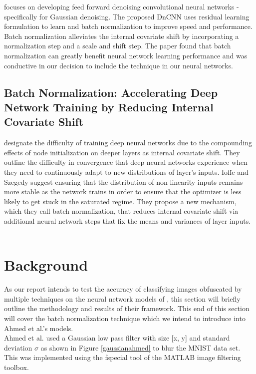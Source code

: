 \documentclass[12pt, titlepage]{article}
\begin{document}
\cite{zhang2017beyond} focuses on developing feed forward denoising convolutional neural networks - specifically for Gaussian denoising. The proposed DnCNN uses residual learning formulation to learn and batch normalization to improve speed and performance. Batch normalization alleviates the internal covariate shift by incorporating a normalization step and a scale and shift step. The paper found that batch normalization can greatly benefit neural network learning performance and was conductive in our decision to include the technique in our neural networks.\\
	
\subsection{Batch Normalization: Accelerating Deep Network Training by Reducing Internal Covariate Shift}

\cite{ioffe2015batch} designate the difficulty of training deep neural networks due to the compounding effects of node initialization on deeper layers as internal covariate shift. They outline the difficulty in convergence that deep neural networks experience when they need to continuously adapt to new distributions of layer's inputs. Ioffe and Szegedy suggest ensuring that the distribution of non-linearity inputs remains more stable as the network trains in order to ensure that the optimizer is less likely to get stuck in the saturated regime. They propose a new mechanism, which they call batch normalization, that reduces internal covariate shift via additional neural network steps that fix the means and variances of layer inputs.\\

~\newpage
\section{Background}\label{Background}

\noindent As our report intends to test the accuracy of classifying images obfuscated by multiple techniques on the neural network models of \cite{ahmed2018obfuscated}, this section will briefly outline the methodology and results of their framework. This end of this section will cover the batch normalization technique which we intend to introduce into Ahmed et al.'s models. \\

\noindent Ahmed et al. used a Gaussian low pass filter with size [x, y] and standard deviation $\sigma$ as shown in Figure \ref{gaussianahmed} to blur the MNIST data set. This was implemented using the fspecial tool of the MATLAB image filtering toolbox. \\
\end{document}
